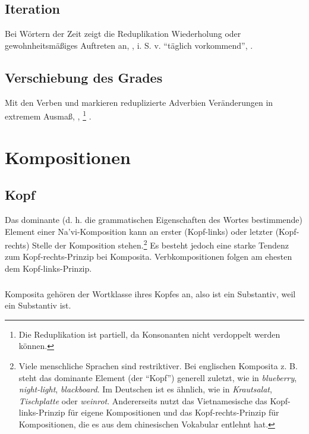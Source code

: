 \subsection{Iteration} Bei Wörtern der Zeit zeigt die Reduplikation Wiederholung oder gewohnheitsmäßiges Auftreten an,  , i. S. v. ``täglich vorkommend'',  .

\subsection{Verschiebung des Grades} Mit den Verben   und   markieren reduplizierte Adverbien Veränderungen in extremem Ausmaß,  , \footnote{Die Reduplikation ist partiell, da Konsonanten nicht verdoppelt werden können.} .

\section{Kompositionen}

\subsection{Kopf} Das dominante (d. h. die grammatischen Eigenschaften des Wortes bestimmende) Element einer Na'vi-Komposition kann an erster (Kopf-links) oder letzter (Kopf-rechts) Stelle der Komposition stehen.\footnote{Viele menschliche Sprachen sind restriktiver. Bei englischen Komposita z. B. steht das dominante Element (der ``Kopf'') generell zuletzt, wie in \textit{blueberry}, \textit{night-light}, \textit{blackboard}. Im Deutschen ist es ähnlich, wie in \textit{Krautsalat}, \textit{Tischplatte} oder \textit{weinrot}. Andererseits nutzt das Vietnamesische das Kopf-links-Prinzip für eigene Kompositionen und das Kopf-rechts-Prinzip für Kompositionen, die es aus dem chinesischen Vokabular entlehnt hat.} Es besteht jedoch eine starke Tendenz zum Kopf-rechts-Prinzip bei Komposita. Verbkompositionen folgen am ehesten dem Kopf-links-Prinzip.

\subsubsection{} Komposita gehören der Wortklasse ihres Kopfes an, also ist   ein Substantiv, weil   ein Substantiv ist.


